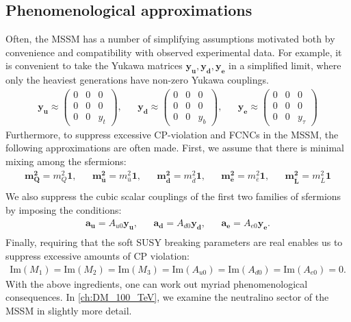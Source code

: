 \subsection{Phenomenological approximations}
Often, the MSSM has a number of simplifying assumptions motivated both by convenience and compatibility with observed experimental data. For example, it is convenient to take the Yukawa matrices $\mathbf{y_u,y_d,y_e}$ in a simplified limit, where only the heaviest generations have non-zero Yukawa couplings. 
\begin{align*}
  \mathbf{y_u} \approx \begin{pmatrix}
    0 & 0 & 0\\
    0 & 0 & 0\\
    0 & 0 & y_t
  \end{pmatrix},&&
  \mathbf{y_d} \approx \begin{pmatrix}
    0 & 0 & 0\\
    0 & 0 & 0\\
    0 & 0 & y_b
  \end{pmatrix},&&
  \mathbf{y_e} \approx \begin{pmatrix}
    0 & 0 & 0\\
    0 & 0 & 0\\
    0 & 0 & y_\tau
  \end{pmatrix}
\end{align*}
Furthermore, to suppress excessive CP-violation and FCNCs in the MSSM, the following approximations are often made. First, we assume that there is minimal mixing among the sfermions:
\begin{align*}
  \mathbf{m_Q^2} = m_Q^2\mathbf{1},&&
  \mathbf{m_{\bar{u}}^2} = m_{\bar{u}}^2\mathbf{1},&&
  \mathbf{m_{\bar{d}}^2} = m_{\bar{d}}^2\mathbf{1},&&
  \mathbf{m_{\bar{e}}^2} = m_{\bar{e}}^2\mathbf{1},&&
  \mathbf{m_{\bar{L}}^2} = m_{\bar{L}}^2\mathbf{1}\\
\end{align*}
We also suppress the cubic scalar couplings of the first two families of sfermions by imposing the conditions: 
\begin{align*}
  \mathbf{a_u} = A_{u0}\mathbf{y_u},&&
  \mathbf{a_d} = A_{d0}\mathbf{y_d},&&
  \mathbf{a_e} = A_{e0}\mathbf{y_e}.\\
\end{align*}
Finally, requiring that the soft SUSY breaking parameters are real enables us to suppress excessive amounts of CP violation:
\begin{align*}
  \text{Im}(M_1)=
  \text{Im}(M_2)=
  \text{Im}(M_3)=
  \text{Im}(A_{u0})=
  \text{Im}(A_{d0})=
  \text{Im}(A_{e0})=0.
\end{align*}
With the above ingredients, one can work out myriad phenomenological consequences. In \autoref{ch:DM_100_TeV}, we examine the neutralino sector of the MSSM in slightly more detail.
